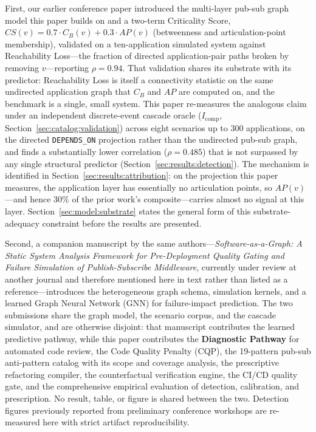 First, our earlier conference paper \citep{yigit2025graph} introduced the multi-layer pub-sub graph model this paper builds on and a two-term Criticality Score, $CS(v) = 0.7\cdot C_B(v) + 0.3\cdot AP(v)$ (betweenness and articulation-point membership), validated on a ten-application simulated system against Reachability Loss---the fraction of directed application-pair paths broken by removing $v$---reporting $\rho = 0.94$. That validation shares its substrate with its predictor: Reachability Loss is itself a connectivity statistic on the same undirected application graph that $C_B$ and $AP$ are computed on, and the benchmark is a single, small system. This paper re-measures the analogous claim under an independent discrete-event cascade oracle ($I_{\text{comp}}$, Section~\ref{sec:catalog:validation}) across eight scenarios up to 300 applications, on the directed \texttt{DEPENDS\_ON} projection rather than the undirected pub-sub graph, and finds a substantially lower correlation ($\rho = 0.485$) that is not surpassed by any single structural predictor (Section~\ref{sec:results:detection}). The mechanism is identified in Section~\ref{sec:results:attribution}: on the projection this paper measures, the application layer has essentially no articulation points, so $AP(v)$---and hence 30\% of the prior work's composite---carries almost no signal at this layer. Section~\ref{sec:model:substrate} states the general form of this substrate-adequacy constraint before the results are presented.

Second, a companion manuscript by the same authors---\emph{Software-as-a-Graph: A Static System Analysis Framework for Pre-Deployment Quality Gating and Failure Simulation of Publish-Subscribe Middleware}, currently under review at another journal and therefore mentioned here in text rather than listed as a reference---introduces the heterogeneous graph schema, simulation kernels, and a learned Graph Neural Network (GNN) for failure-impact prediction. The two submissions share the graph model, the scenario corpus, and the cascade simulator, and are otherwise disjoint: that manuscript contributes the learned predictive pathway, while this paper contributes the \textbf{Diagnostic Pathway} for automated code review, the Code Quality Penalty (CQP), the 19-pattern pub-sub anti-pattern catalog with its scope and coverage analysis, the prescriptive refactoring compiler, the counterfactual verification engine, the CI/CD quality gate, and the comprehensive empirical evaluation of detection, calibration, and prescription. No result, table, or figure is shared between the two. Detection figures previously reported from preliminary conference workshops are re-measured here with strict artifact reproducibility.

